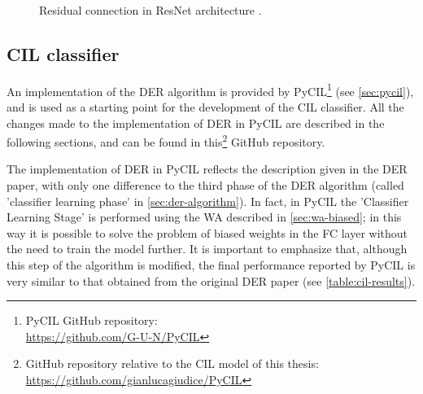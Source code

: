 \begin{figure}%
	\centering
	\hfill
	\caption{Residual connection in ResNet architecture \cite{he2016deep}.}%
	\label{fig:residual-connection}%
\end{figure}

\subsection{CIL classifier}
An implementation of the DER algorithm is provided by PyCIL\footnote{PyCIL GitHub repository: \\ \href{https://github.com/G-U-N/PyCIL}{https://github.com/G-U-N/PyCIL}} (see \autoref{sec:pycil}), and is used as a starting point for the development of the CIL classifier. 
All the changes made to the implementation of DER in PyCIL are described in the following sections, and can be found in this\footnote{GitHub repository relative to the CIL model of this thesis: \\ \href{https://github.com/gianlucagiudice/PyCIL}{https://github.com/gianlucagiudice/PyCIL}} GitHub repository.

The implementation of DER in PyCIL reflects the description given in the DER paper, with only one difference to the third phase of the DER algorithm (called 'classifier learning phase' in \autoref{sec:der-algorithm}). 
In fact, in PyCIL the 'Classifier Learning Stage' is performed using the WA described in \autoref{sec:wa-biased}; in this way it is possible to solve the problem of biased weights in the FC layer without the need to train the model further.
It is important to emphasize that, although this step of the algorithm is modified, the final performance reported by PyCIL is very similar to that obtained from the original DER paper (see \autoref{table:cil-results}).

